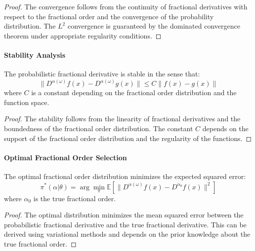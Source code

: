 \begin{proof}
The convergence follows from the continuity of fractional derivatives with respect to the fractional order and the convergence of the probability distribution. The $L^2$ convergence is guaranteed by the dominated convergence theorem under appropriate regularity conditions.
\end{proof}

\paragraph{Stability Analysis}

\begin{theorem}
The probabilistic fractional derivative is stable in the sense that:
\begin{equation}
\|D^{\alpha(\omega)} f(x) - D^{\alpha(\omega)} g(x)\| \leq C \|f(x) - g(x)\|
\end{equation}
where $C$ is a constant depending on the fractional order distribution and the function space.
\end{theorem}

\begin{proof}
The stability follows from the linearity of fractional derivatives and the boundedness of the fractional order distribution. The constant $C$ depends on the support of the fractional order distribution and the regularity of the functions.
\end{proof}

\paragraph{Optimal Fractional Order Selection}

\begin{theorem}
The optimal fractional order distribution minimizes the expected squared error:
\begin{equation}
\pi^*(\alpha|\theta) = \arg\min_{\pi} \mathbb{E}[\|D^{\alpha(\omega)} f(x) - D^{\alpha_0} f(x)\|^2]
\end{equation}
where $\alpha_0$ is the true fractional order.
\end{theorem}

\begin{proof}
The optimal distribution minimizes the mean squared error between the probabilistic fractional derivative and the true fractional derivative. This can be derived using variational methods and depends on the prior knowledge about the true fractional order.
\end{proof}

